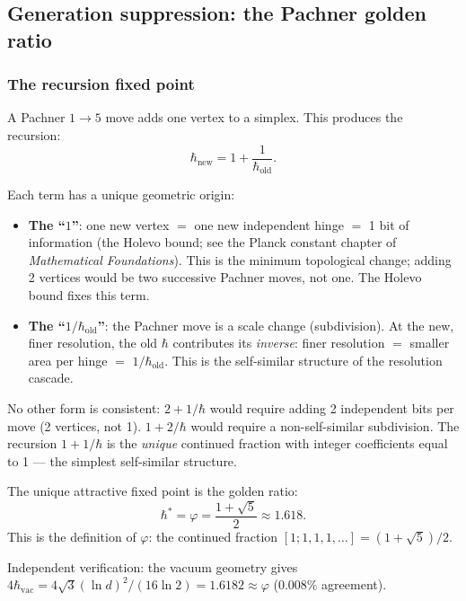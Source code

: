 \documentclass[12pt]{article}
\theoremstyle{remark}
\theoremstyle{definition}
\begin{document}
\subsection{Generation suppression: the Pachner golden ratio}

\subsubsection{The recursion fixed point}

A Pachner $1 \to 5$ move adds one vertex to a simplex. This produces the recursion:
\begin{equation}
\hbar_\text{new} = 1 + \frac{1}{\hbar_\text{old}}.
\end{equation}

Each term has a unique geometric origin:
\begin{itemize}
\item \textbf{The ``$1$''}: one new vertex $=$ one new independent hinge $=$ 1 bit of information (the Holevo bound; see the Planck constant chapter of \textit{Mathematical Foundations}). This is the minimum topological change; adding 2 vertices would be two successive Pachner moves, not one. The Holevo bound fixes this term.
\item \textbf{The ``$1/\hbar_\text{old}$''}: the Pachner move is a scale change (subdivision). At the new, finer resolution, the old $\hbar$ contributes its \emph{inverse}: finer resolution $=$ smaller area per hinge $=$ $1/\hbar_\text{old}$. This is the self-similar structure of the resolution cascade.
\end{itemize}

No other form is consistent: $2 + 1/\hbar$ would require adding 2 independent bits per move (2 vertices, not 1). $1 + 2/\hbar$ would require a non-self-similar subdivision. The recursion $1 + 1/\hbar$ is the \emph{unique} continued fraction with integer coefficients equal to 1 --- the simplest self-similar structure.

The unique attractive fixed point is the golden ratio:
\begin{equation}
\hbar^* = \varphi = \frac{1 + \sqrt{5}}{2} \approx 1.618.
\end{equation}
This is the definition of $\varphi$: the continued fraction $[1; 1, 1, 1, \ldots] = (1+\sqrt{5})/2$.

Independent verification: the vacuum geometry gives $4\hbar_\text{vac} = 4\sqrt{3}(\ln d)^2/(16\ln 2) = 1.6182 \approx \varphi$ (0.008\% agreement).
\end{document}
